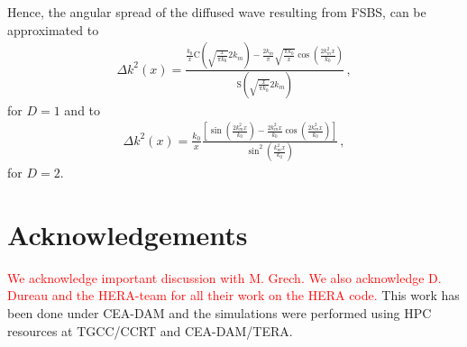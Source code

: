 \documentclass[
 reprint,
 amsmath,amssymb,
 aps,
]{revtex4-1}
\begin{document}
 Hence, the angular spread of the diffused wave resulting from FSBS,  can be approximated to 
  \begin{align}
 \Delta k ^2(x) = \frac{
 \frac{k_0}{x}  \mathrm{C}\left( \sqrt{\frac{x}{\pi k_0}}  2k_m \right)
 -\frac{2k_m}{\pi}\sqrt{\frac{\pi k_0}{x}}\cos\left(\frac{ 2k_m^2x}{k_0}\right)
 }{
 \mathrm{S}\left( \sqrt{\frac{x}{\pi k_0}}  2k_m \right)
 }\, ,
\end{align}
for $D=1$ and to 
\begin{align}
 \Delta k ^2(x) =  \frac{ k_0}{x} \frac{
 \left[ \sin\left( \frac{ 2k_m^2 x}{k_0} \right) -\frac{ 2k_m^2x}{k_0}\cos\left( \frac{ 2k_m^2x}{k_0}\right) \right]
 }{
\sin^2 \left( \frac{ k_m^2x}{k_0}\right)
 }\, ,
\end{align}
for $D=2$.


\section*{Acknowledgements}
 \textcolor{red}{We acknowledge important discussion with M. Grech.  
 We also acknowledge D. Dureau and the HERA-team for all their work on the HERA code. }
This work has been done under   CEA-DAM and
the simulations were performed using HPC resources at TGCC/CCRT and CEA-DAM/TERA.

\end{document}
